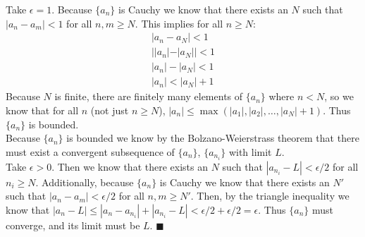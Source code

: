     Take $\epsilon = 1$. Because $\{a_n\}$ is Cauchy we know that there exists an $N$ such
    that $|a_n - a_m| < 1$ for all $n, m \geq N$. This implies for all $n \geq N$:
    \begin{align*}
      |a_n - a_N| < 1\\
      ||a_n| - |a_N|| < 1\\
      |a_n| - |a_N| < 1\\
      |a_n| <  |a_N| + 1
    \end{align*}
    Because $N$ is finite, there are finitely many elements of $\{a_n\}$ where $n < N$, so we
    know that for all $n$ (not just $n \geq N$), $|a_n| \leq \max(|a_1|,|a_2|,\ldots,
    |a_N|+1)$. Thus $\{a_n\}$ is bounded.\\

    Because $\{a_n\}$ is bounded we know by the Bolzano-Weierstrass theorem that there must 
    exist a convergent subsequence of $\{a_n\}$, $\{a_{n_i}\}$ with limit $L$.\\

    Take $\epsilon > 0$. Then we know that there exists an $N$ such that $|a_{n_i} - L| < 
    \epsilon/2$ for all $n_i \geq N$. Additionally, because $\{a_n\}$ is Cauchy we know that
    there exists an $N'$ such that $|a_n - a_m| < \epsilon/2$ for all $n,m \geq N'$. Then, by
    the triangle inequality we know that $|a_n - L| \leq |a_n - a_{n_i}| + |a_{n_i} - L| < 
    \epsilon/2 + \epsilon/2 = \epsilon$. Thus $\{a_n\}$ must converge, and its limit must be
    $L$. $\blacksquare$
